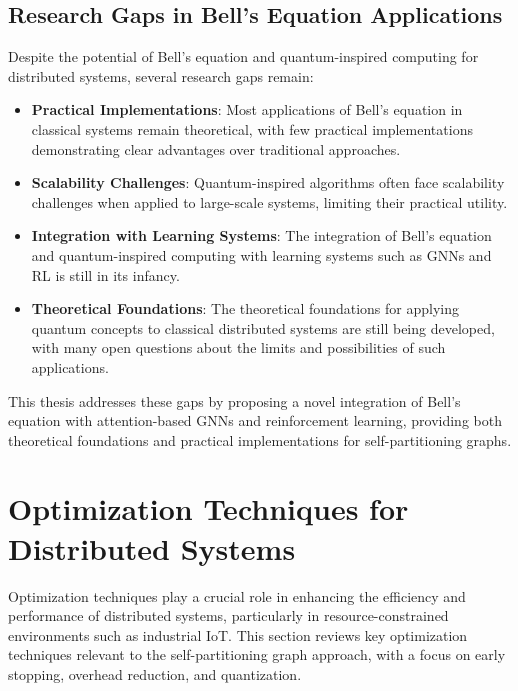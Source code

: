 \documentclass{article}
\begin{document}
\subsection{Research Gaps in Bell's Equation Applications}

Despite the potential of Bell's equation and quantum-inspired computing for distributed systems, several research gaps remain:

\begin{itemize}
    \item \textbf{Practical Implementations}: Most applications of Bell's equation in classical systems remain theoretical, with few practical implementations demonstrating clear advantages over traditional approaches.
    
    \item \textbf{Scalability Challenges}: Quantum-inspired algorithms often face scalability challenges when applied to large-scale systems, limiting their practical utility.
    
    \item \textbf{Integration with Learning Systems}: The integration of Bell's equation and quantum-inspired computing with learning systems such as GNNs and RL is still in its infancy.
    
    \item \textbf{Theoretical Foundations}: The theoretical foundations for applying quantum concepts to classical distributed systems are still being developed, with many open questions about the limits and possibilities of such applications.
\end{itemize}

This thesis addresses these gaps by proposing a novel integration of Bell's equation with attention-based GNNs and reinforcement learning, providing both theoretical foundations and practical implementations for self-partitioning graphs.

\section{Optimization Techniques for Distributed Systems}

Optimization techniques play a crucial role in enhancing the efficiency and performance of distributed systems, particularly in resource-constrained environments such as industrial IoT. This section reviews key optimization techniques relevant to the self-partitioning graph approach, with a focus on early stopping, overhead reduction, and quantization.
\end{document}
